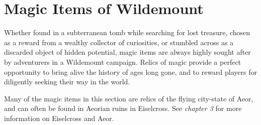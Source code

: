 \documentclass[10pt,a4paper,twoside,bg=print,twocolumn,openany,nodeprecatedcode]{dndbook}
\begin{document}
\section{Magic Items of Wildemount}
Whether found in a subterranean tomb while searching for lost treasure, chosen as a reward from a wealthy collector of curiosities, or stumbled across as a discarded object of hidden potential, magic items are always highly sought after by adventurers in a Wildemount campaign. Relics of magic provide a perfect opportunity to bring alive the history of ages long gone, and to reward players for diligently seeking their way in the world.

Many of the magic items in this section are relics of the flying city-state of Aeor, and can often be found in Aeorian ruins in Eiselcross. See \textit{chapter 3} for more information on Eiselcross and Aeor.
\end{document}
